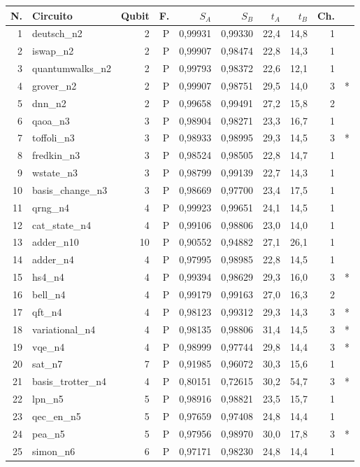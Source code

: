 \documentclass[11pt,a4paper]{article}
\begin{document}
\begin{center}
\setlength{\tabcolsep}{5pt}
\begin{tabular}{rlrrrrrrrr}
\toprule
N. & Circuito & Qubit & F. & $S_A$ & $S_B$ & $t_A$ & $t_B$ & Ch. & \\
\midrule
1 & deutsch\_n2 & 2 & P & 0,99931 & 0,99330 & 22,4 & 14,8 & 1 & \\
2 & iswap\_n2 & 2 & P & 0,99907 & 0,98474 & 22,8 & 14,3 & 1 & \\
3 & quantumwalks\_n2 & 2 & P & 0,99793 & 0,98372 & 22,6 & 12,1 & 1 & \\
4 & grover\_n2 & 2 & P & 0,99907 & 0,98751 & 29,5 & 14,0 & 3 & *\\
5 & dnn\_n2 & 2 & P & 0,99658 & 0,99491 & 27,2 & 15,8 & 2 & \\
6 & qaoa\_n3 & 3 & P & 0,98904 & 0,98271 & 23,3 & 16,7 & 1 & \\
7 & toffoli\_n3 & 3 & P & 0,98933 & 0,98995 & 29,3 & 14,5 & 3 & *\\
8 & fredkin\_n3 & 3 & P & 0,98524 & 0,98505 & 22,8 & 14,7 & 1 & \\
9 & wstate\_n3 & 3 & P & 0,98799 & 0,99139 & 22,7 & 14,3 & 1 & \\
10 & basis\_change\_n3 & 3 & P & 0,98669 & 0,97700 & 23,4 & 17,5 & 1 & \\
11 & qrng\_n4 & 4 & P & 0,99923 & 0,99651 & 24,1 & 14,5 & 1 & \\
12 & cat\_state\_n4 & 4 & P & 0,99106 & 0,98806 & 23,0 & 14,0 & 1 & \\
13 & adder\_n10 & 10 & P & 0,90552 & 0,94882 & 27,1 & 26,1 & 1 & \\
14 & adder\_n4 & 4 & P & 0,97995 & 0,98985 & 22,8 & 14,5 & 1 & \\
15 & hs4\_n4 & 4 & P & 0,99394 & 0,98629 & 29,3 & 16,0 & 3 & *\\
16 & bell\_n4 & 4 & P & 0,99179 & 0,99163 & 27,0 & 16,3 & 2 & \\
17 & qft\_n4 & 4 & P & 0,98123 & 0,99312 & 29,3 & 14,3 & 3 & *\\
18 & variational\_n4 & 4 & P & 0,98135 & 0,98806 & 31,4 & 14,5 & 3 & *\\
19 & vqe\_n4 & 4 & P & 0,98999 & 0,97744 & 29,8 & 14,4 & 3 & *\\
20 & sat\_n7 & 7 & P & 0,91985 & 0,96072 & 30,3 & 15,6 & 1 & \\
21 & basis\_trotter\_n4 & 4 & P & 0,80151 & 0,72615 & 30,2 & 54,7 & 3 & *\\
22 & lpn\_n5 & 5 & P & 0,98916 & 0,98821 & 23,5 & 15,7 & 1 & \\
23 & qec\_en\_n5 & 5 & P & 0,97659 & 0,97408 & 24,8 & 14,4 & 1 & \\
24 & pea\_n5 & 5 & P & 0,97956 & 0,98970 & 30,0 & 17,8 & 3 & *\\
25 & simon\_n6 & 6 & P & 0,97171 & 0,98230 & 24,8 & 14,4 & 1 & \\
\bottomrule
\end{tabular}\end{center}
\end{document}
